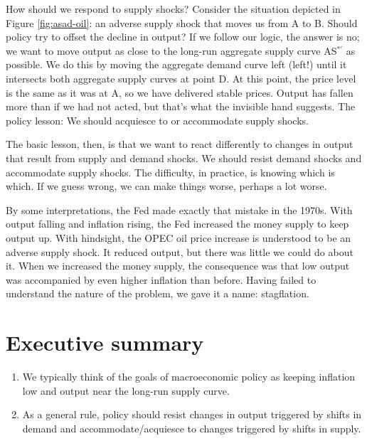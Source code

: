 How should we respond to supply shocks? 
Consider the situation depicted in Figure \ref{fig:asad-oil}:
an adverse supply shock that moves us from A to B.
Should policy try to offset the decline in output?
If we follow our logic, the answer is no;
we want to move output as close to the long-run aggregate supply 
curve AS$^{*\prime}$ as possible.
We do this by moving the aggregate demand
 curve left (left!) until it intersects
both aggregate supply
 curves at point D.
At this point, the price level is the same as it was at A,
so we have delivered stable prices.
Output has fallen more than if we had not acted,
but that's what the invisible hand suggests.
The policy lesson:  We should acquiesce to or accommodate
supply shocks.

The basic lesson, then, is that we want to react differently to
changes in output that result from supply and demand shocks.
We should resist demand shocks and accommodate supply shocks.
The difficulty, in practice, is knowing which is which.
If we guess wrong, we can make things worse, perhaps a lot worse.

By some interpretations, the Fed made exactly that mistake in the 1970s.
With output falling and inflation rising, the Fed increased the money
supply to keep output up.
With hindsight, the OPEC oil price increase is understood to be an
adverse supply shock.
It reduced output, but there was little we could do about it.
When we increased the money supply, the consequence was that low
output was accompanied by even higher inflation than before.
Having failed to understand the nature of the problem,
we gave it a name:  stagflation.


\section*{Executive summary}

\setlength{\leftmargini}{.5\oldleftmargini}
\begin{enumerate}
\item We typically think of the goals of macroeconomic
policy as keeping inflation low and output near the long-run
supply curve.

\item As a general rule, policy should resist changes in output
triggered by shifts in demand and accommodate/acquiesce
to changes triggered by shifts in supply.
\end{enumerate}
\setlength{\leftmargini}{\oldleftmargini}

